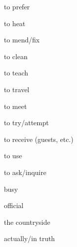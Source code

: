\begin{flashcard}{\LARGE to prefer}
\LARGE {}
\end{flashcard}
\begin{flashcard}{\LARGE to heat}
\LARGE {}
\end{flashcard}
\begin{flashcard}{\LARGE to mend/fix}
\LARGE {}
\end{flashcard}
\begin{flashcard}{\LARGE to clean}
\LARGE {}
\end{flashcard}
\begin{flashcard}{\LARGE to teach}
\LARGE {}
\end{flashcard}
\begin{flashcard}{\LARGE to travel}
\LARGE {}
\end{flashcard}
\begin{flashcard}{\LARGE to meet}
\LARGE {}
\end{flashcard}
\begin{flashcard}{\LARGE to try/attempt}
\LARGE {}
\end{flashcard}
\begin{flashcard}{\LARGE to receive (guests, etc.)}
\LARGE {}
\end{flashcard}
\begin{flashcard}{\LARGE to use}
\LARGE {}
\end{flashcard}
\begin{flashcard}{\LARGE to ask/inquire}
\LARGE {}
\end{flashcard}
\begin{flashcard}{\LARGE busy}
\LARGE {}
\end{flashcard}
\begin{flashcard}{\LARGE official}
\LARGE {}
\end{flashcard}
\begin{flashcard}{\LARGE the countryside}
\LARGE {}
\end{flashcard}
\begin{flashcard}{\LARGE actually/in truth}
\LARGE {}
\end{flashcard}

